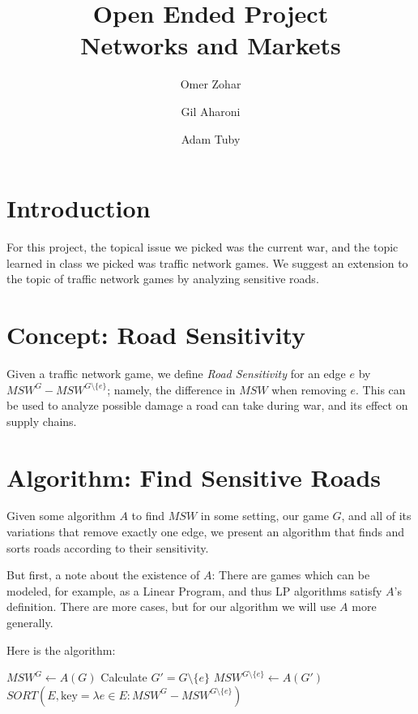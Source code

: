 \documentclass{article}
\title{
    Open Ended Project\\
    Networks and Markets
}
\author{
    Omer Zohar
    \and
    Gil Aharoni
    \and
    Adam Tuby
}
\begin{document}
\maketitle

\section{Introduction}

For this project, the topical issue we picked was the current war, and the topic learned in class we picked was traffic network games. We suggest an extension to the topic of traffic network games by analyzing sensitive roads.

\section{Concept: Road Sensitivity}

Given a traffic network game, we define \emph{Road Sensitivity} for an edge $e$ by $MSW^G - MSW^{G \setminus \{e\}}$; namely, the difference in $MSW$ when removing $e$. This can be used to analyze possible damage a road can take during war, and its effect on supply chains.

\section{Algorithm: Find Sensitive Roads}

Given some algorithm $A$ to find $MSW$ in some setting, our game $G$, and all of its variations that remove exactly one edge, we present an algorithm that finds and sorts roads according to their sensitivity.

But first, a note about the existence of $A$: There are games which can be modeled, for example, as a Linear Program, and thus LP algorithms satisfy $A$'s definition. There are more cases, but for our algorithm we will use $A$ more generally.

Here is the algorithm:

\begin{algorithm}[H]
\caption{FIND-ROAD-SENSITIVITY($G$)}
\begin{algorithmic}[1]
    \STATE $MSW^G \leftarrow A(G)$
        \STATE Calculate $G' = G \setminus \{e\}$
        \STATE $MSW^{G \setminus \{e\}} \leftarrow A(G')$
    \ENDFOR
    \RETURN $SORT(E, \text{key} = \lambda e \in E: MSW^G - MSW^{G \setminus \{e\}})$
\end{algorithmic}
\end{algorithm}
\end{document}
